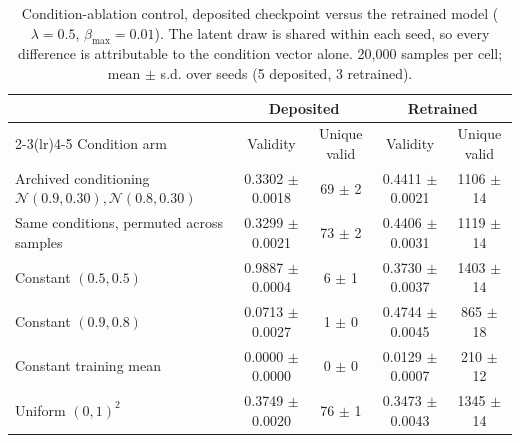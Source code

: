 \begin{table}[t]
\centering
\caption{Condition-ablation control, deposited checkpoint versus the retrained model ($\lambda=0.5$, $\beta_{\max}=0.01$). The latent draw is shared within each seed, so every difference is attributable to the condition vector alone. 20{,}000 samples per cell; mean $\pm$ s.d. over seeds (5 deposited, 3 retrained).}
\label{tab:a8_unconditional}
\begin{tabular}{lcccc}
\toprule
& \multicolumn{2}{c}{Deposited} & \multicolumn{2}{c}{Retrained} \\
\cmidrule(lr){2-3}\cmidrule(lr){4-5}
Condition arm & Validity & Unique valid & Validity & Unique valid \\
\midrule
Archived conditioning $\mathcal{N}(0.9,0.30),\mathcal{N}(0.8,0.30)$ & 0.3302 $\pm$ 0.0018 & 69 $\pm$ 2 & 0.4411 $\pm$ 0.0021 & 1106 $\pm$ 14 \\
Same conditions, permuted across samples & 0.3299 $\pm$ 0.0021 & 73 $\pm$ 2 & 0.4406 $\pm$ 0.0031 & 1119 $\pm$ 14 \\
Constant $(0.5,0.5)$ & 0.9887 $\pm$ 0.0004 & 6 $\pm$ 1 & 0.3730 $\pm$ 0.0037 & 1403 $\pm$ 14 \\
Constant $(0.9,0.8)$ & 0.0713 $\pm$ 0.0027 & 1 $\pm$ 0 & 0.4744 $\pm$ 0.0045 & 865 $\pm$ 18 \\
Constant training mean & 0.0000 $\pm$ 0.0000 & 0 $\pm$ 0 & 0.0129 $\pm$ 0.0007 & 210 $\pm$ 12 \\
Uniform $(0,1)^2$ & 0.3749 $\pm$ 0.0020 & 76 $\pm$ 1 & 0.3473 $\pm$ 0.0043 & 1345 $\pm$ 14 \\
\bottomrule
\end{tabular}
\end{table}

